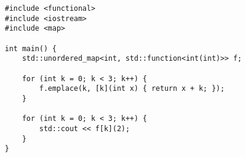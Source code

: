 \begin{lstlisting}[title=\href{https://godbolt.org/z/q9MpAW}{\texttt{godbolt.org/z/q9MpAW}}]
#include <functional>
#include <iostream>
#include <map>

int main() {
    std::unordered_map<int, std::function<int(int)>> f;
    
    for (int k = 0; k < 3; k++) {
        f.emplace(k, [k](int x) { return x + k; });
    }

    for (int k = 0; k < 3; k++) {
        std::cout << f[k](2);
    }
}
\end{lstlisting}
